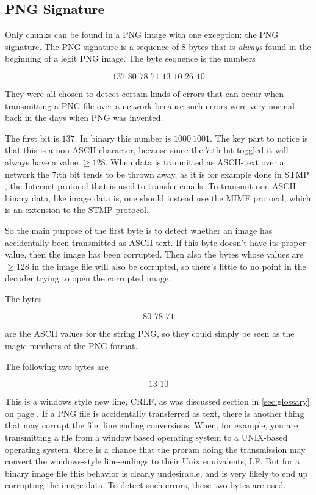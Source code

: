 \subsection{PNG Signature}

Only chunks can be found in a PNG image with one exception: the PNG
signature. The PNG signature is a sequence of 8 bytes that is
\textit{always} found in the beginning of a legit PNG image. The byte
sequence is the numbers

\begin{equation*}
  \text{137 80 78 71 13 10 26 10}
\end{equation*}

They were all chosen to detect certain kinds of errors that can occur
when transmitting a PNG file over a network because such errors were
very normal back in the days when PNG was invented.

The first bit is $137$. In binary this number is $1000\ 1001$. The key
part to notice is that this is a non-ASCII character, because since
the 7:th bit toggled it will always have a value $\ge 128$. When data
is tranmitted as ASCII-text over a network the 7:th bit tends to be
thrown away, as it is for example done in STMP \cite{rfc5321}, the
Internet protocol that is used to transfer emails. To transmit
non-ASCII binary data, like image data is, one should instead use the
MIME protocol, which is an extension to the STMP protocol.

So the main purpose of the first byte is to detect whether an image
has accidentally been transmitted as ASCII text. If this byte doesn't
have its proper value, then the image has been corrupted. Then also
the bytes whose values are $\ge 128$ in the image file will also be
corrupted, so there's little to no point in the decoder trying to open
the corrupted image.

The bytes

\begin{equation*}
  \text{80 78 71}
\end{equation*}

are the ASCII values for the string PNG, so they could simply be seen
as the magic numbers of the PNG format.

The following two bytes are

\begin{equation*}
  \text{13 10}
\end{equation*}

This is a windows style new line, CRLF, as was discussed section in
\ref{sec:glossary} on page \pageref{sec:glossary}. If a PNG file is
accidentally transferred as text, there is another thing that may
corrupt the file: line ending conversions. When, for example, you are
transmitting a file from a window based operating system to a
UNIX-based operating system, there is a chance that the proram doing
the transmission may convert the windows-style line-endings to their
Unix equivalents, LF. But for a binary image file this behavior is
clearly undesirable, and is very likely to end up corrupting the image
data. To detect such errors, these two bytes are used.

